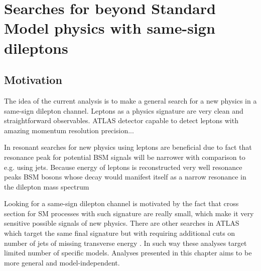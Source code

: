 \chapter{Searches for beyond Standard Model physics with same-sign dileptons}
\label{chap:SS}
\section{Motivation}





The idea of the current analysis is to make a general search for a new physics in a same-sign dilepton channel. \toFix
Leptons as a physics signature are very clean and straightforward observables. 
ATLAS detector capable to detect leptons with amazing momentum resolution precision... 

In resonant searches for new physics using leptons are beneficial due to fact that resonance peak for potential BSM signals will be narrower with comparison to e.g. using jets.
Because energy of leptons is reconstructed very well resonance peaks 
BSM bosons whose decay would manifest itself as a narrow resonance in the dilepton mass spectrum

Looking for a same-sign dilepton channel is motivated by the fact that cross section for SM processes with such signature are really small, which make 
it very sensitive possible signals of new physics.  \toFix
There are other searches in ATLAS which target the same final signature but with requiring additional cuts on number of jets \toFix[link] of missing transverse energy \toFix[link].
In such way these analyses target limited number of specific models.
Analyses presented in this chapter aims to be more general and model-independent. 

